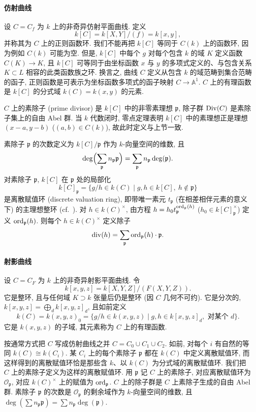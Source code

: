 \paragraph{仿射曲线}
设 $C = C_f$ 为 $k$ 上的非奇异仿射平面曲线. 定义
\[
k[C] = k[X,Y]/(f) = k[x,y],
\]
并称其为 $C$ 上的正则函数环. 我们不能再把 $k[C]$ 等同于 $C(k)$ 上的函数环, 因为例如 $C(k)$ 可能为空. 但是, $k[C]$ 中每个 $g$ 对每个包含 $k$ 的域 $K$ 定义函数 $C(K)\to K$, 且 $k[C]$ 可等同于由坐标函数 $x$ 与 $y$ 的多项式定义的、与包含关系 $K\subset L$ 相容的此类函数族之环. 换言之, 曲线 $C$ 定义从包含 $k$ 的域范畴到集合范畴的函子, 正则函数是可表示为坐标函数多项式的函子映射 $C\to\mathbb{A}^1$. $C$ 上的有理函数是 $k[C]$ 的分式域 $k(C) = k(x,y)$ 的元素.

$C$ 上的素除子 (prime divisor) 是 $k[C]$ 中的非零素理想 $\mathfrak{p}$, 除子群 $\operatorname{Div}(C)$ 是素除子集上的自由 Abel 群. 当 $k$ 代数闭时, 零点定理表明 $k[C]$ 中的素理想正是理想 $(x-a, y-b)$ ($(a,b)\in C(k)$), 故此时定义与上节一致.

素除子 $\mathfrak{p}$ 的次数定义为 $k[C]/\mathfrak{p}$ 作为 $k$-向量空间的维数, 且
\[
\deg\Bigl(\sum_{\mathfrak{p}} n_\mathfrak{p}\mathfrak{p}\Bigr) = \sum_{\mathfrak{p}} n_\mathfrak{p}\deg(\mathfrak{p}).
\]
对素除子 $\mathfrak{p}$, $k[C]$ 在 $\mathfrak{p}$ 处的局部化
\[
k[C]_\mathfrak{p} = \{g/h\in k(C) \mid g,h\in k[C],\ h\notin\mathfrak{p}\}
\]
是离散赋值环 (discrete valuation ring), 即带唯一素元 $t_\mathfrak{p}$ (在相差相伴元素的意义下) 的主理想整环 (cf.\ \cite[\S3.2]{fulton1969}). 对 $h\in k(C)^{\times}$, 由方程 $h = h_0t_\mathfrak{p}^{\operatorname*{ord}\nolimits_\mathfrak{p}(h)}$ ($h_0\in k[C]_\mathfrak{p}^{\times}$) 定义 $\operatorname*{ord}\nolimits_\mathfrak{p}(h)$. 则每个 $h\in k(C)^{\times}$ 定义除子
\[
\operatorname{div}(h) = \sum_{\mathfrak{p}}\operatorname*{ord}\nolimits_\mathfrak{p}(h)\cdot\mathfrak{p}.
\]

\paragraph{射影曲线}
设 $C = C_F$ 为 $k$ 上的非奇异射影平面曲线. 令
\[
k[x,y,z] = k[X,Y,Z]/(F(X,Y,Z)).
\]
它是整环, 且与任何域 $K\supset k$ 张量后仍是整环 (因 $C$ 几何不可约). 它是分次的, $k[x,y,z] = \bigoplus_d k[x,y,z]_d$, 且如前定义
\[
k(C) = k(x,y,z)_0 = \{g/h\in k(x,y,z) \mid g,h\in k[x,y,z]_d, \text{ 对某个 } d\}.
\]
它是 $k(x,y,z)$ 的子域, 其元素称为 $C$ 上的有理函数.

按通常方式把 $C$ 写成仿射曲线之并 $C = C_0\cup C_1\cup C_2$. 如前, 对每个 $i$ 有自然的等同 $k(C)\cong k(C_i)$. 某 $C_i$ 上的每个素除子 $\mathfrak{p}$ 都在 $k(C)$ 中定义离散赋值环, 而这样得到的离散赋值环恰是那些含 $k$、以 $k(C)$ 为分式域的离散赋值环. 我们把 $C$ 上的素除子定义为这样的离散赋值环. 用 $\mathfrak{p}$ 记 $C$ 上的素除子, 对应离散赋值环为 $\mathcal{O}_\mathfrak{p}$, 对应 $k(C)^{\times}$ 上的赋值为 $\operatorname*{ord}\nolimits_\mathfrak{p}$. $C$ 上的除子群是 $C$ 上素除子生成的自由 Abel 群. 素除子 $\mathfrak{p}$ 的次数是 $\mathcal{O}_\mathfrak{p}$ 的剩余域作为 $k$-向量空间的维数, 且 $\deg(\sum n_\mathfrak{p}\mathfrak{p}) = \sum n_\mathfrak{p}\deg(\mathfrak{p})$.

